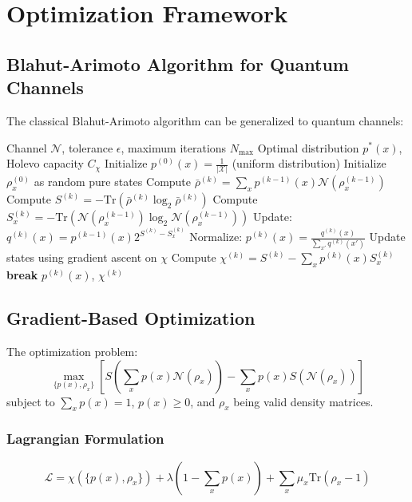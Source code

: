\documentclass[12pt]{article}
\begin{document}
\section{Optimization Framework}

\subsection{Blahut-Arimoto Algorithm for Quantum Channels}
The classical Blahut-Arimoto algorithm can be generalized to quantum channels:

\begin{algorithm}
\caption{Quantum Blahut-Arimoto Algorithm}
\begin{algorithmic}[1]
\Require Channel $\mathcal{N}$, tolerance $\epsilon$, maximum iterations $N_{\max}$
\Ensure Optimal distribution $p^*(x)$, Holevo capacity $C_{\chi}$
\State Initialize $p^{(0)}(x) = \frac{1}{|\mathcal{X}|}$ (uniform distribution)
\State Initialize $\rho_x^{(0)}$ as random pure states
    \State Compute $\bar{\rho}^{(k)} = \sum_x p^{(k-1)}(x) \mathcal{N}(\rho_x^{(k-1)})$
    \State Compute $S^{(k)} = -\text{Tr}(\bar{\rho}^{(k)} \log_2 \bar{\rho}^{(k)})$
        \State Compute $S_x^{(k)} = -\text{Tr}(\mathcal{N}(\rho_x^{(k-1)}) \log_2 \mathcal{N}(\rho_x^{(k-1)}))$
        \State Update: $q^{(k)}(x) = p^{(k-1)}(x) 2^{S^{(k)} - S_x^{(k)}}$
    \EndFor
    \State Normalize: $p^{(k)}(x) = \frac{q^{(k)}(x)}{\sum_{x'} q^{(k)}(x')}$
    \State Update states using gradient ascent on $\chi$
    \State Compute $\chi^{(k)} = S^{(k)} - \sum_x p^{(k)}(x) S_x^{(k)}$
        \State \textbf{break}
    \EndIf
\EndFor
\State \Return $p^{(k)}(x)$, $\chi^{(k)}$
\end{algorithmic}
\end{algorithm}

\subsection{Gradient-Based Optimization}
The optimization problem:
\[
\max_{\{p(x), \rho_x\}} \left[ S\left( \sum_{x} p(x) \mathcal{N}(\rho_x) \right) - \sum_{x} p(x) S(\mathcal{N}(\rho_x)) \right]
\]
subject to $\sum_x p(x) = 1$, $p(x) \geq 0$, and $\rho_x$ being valid density matrices.

\subsubsection{Lagrangian Formulation}
\begin{equation}
\mathcal{L} = \chi(\{p(x), \rho_x\}) + \lambda\left(1 - \sum_x p(x)\right) + \sum_x \mu_x \text{Tr}(\rho_x - 1)
\label{eq:lagrangian}
\end{equation}
\end{document}
